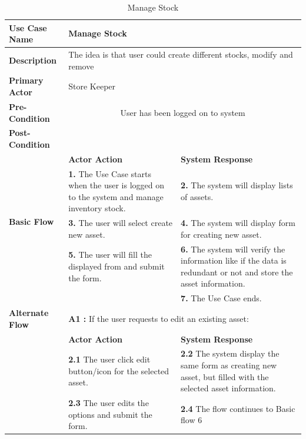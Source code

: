 \begin{table}[!h]
\begin{tabular}{|l|p{6cm}|p{6cm}|}
\hline 
\rule[-1ex]{0pt}{2.5ex} \textbf{Use Case Name} & \multicolumn{2}{p{10cm}|}{Manage Stock} \\ 
\hline 
\rule[-1ex]{0pt}{2.5ex} \textbf{Description} &\multicolumn{2}{p{10cm}|}{The idea is that user could create different stocks, modify and remove} \\ 
\hline 
\rule[-1ex]{0pt}{2.5ex} \textbf{Primary Actor}& \multicolumn{2}{p{10cm}|}{Store Keeper} \\ 
\hline 
\rule[-1ex]{0pt}{2.5ex} \textbf{Pre-Condition} & \multicolumn{2}{c|}{User has been logged on to system} \\ 
\hline 
\rule[-1ex]{0pt}{2.5ex} \textbf{Post-Condition} & \multicolumn{2}{p{10cm}|}{}  \\ 
\hline 
\multirow{4}{*}{\textbf{Basic Flow}} & \textbf{Actor Action} & \textbf{System Response}\\
\cline{2-3}
%
&
\textbf{1.}  The Use Case starts when the user is logged on to the system and manage inventory stock.
& 
\textbf{2.}  The system will display lists of assets.
\\
%
&
\textbf{3.}  The user will select create new asset.
& 
\textbf{4.}  The system will display form for creating new asset. 
\\
%
&
\textbf{5.}  The user will fill the displayed from and submit the form.
& 
\textbf{6.}  The system will verify the information like if the data is redundant or not and store the asset information. 
\\
%
&

& 
\textbf{7.}  The Use Case ends. 
\\
\hline 
\rule[-1ex]{0pt}{2.5ex} \textbf{Alternate Flow} & \multicolumn{2}{p{10cm}|}{\textbf{A1 : } If the user requests to edit an existing asset:}  \\ 
\cline{2-3}
\multirow{2}{*}{} & \textbf{Actor Action} & \textbf{System Response}\\
\cline{2-3}
%
&
\textbf{2.1}  The user click edit button/icon for the selected asset. 
& 
\textbf{2.2}  The system display the same form as creating new asset, but filled with the selected asset information. 
\\
%
&
\textbf{2.3}  The user edits the options and submit the form. 
& 
\textbf{2.4}  The flow continues to Basic flow 6  
\\
\hline
\end{tabular}
\caption{Manage Stock} 
\end{table}

